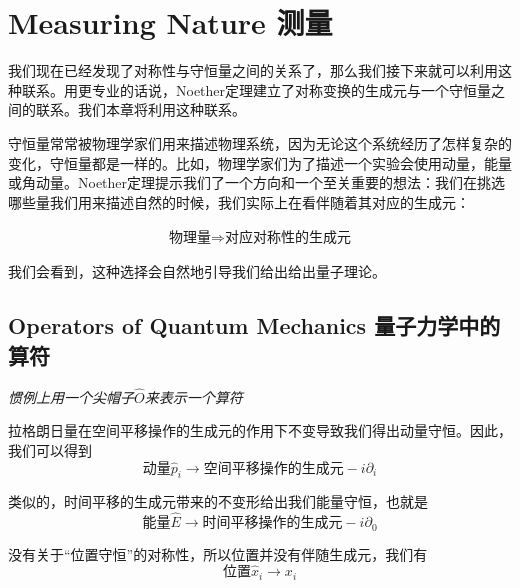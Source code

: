 


\chapter[测量]{Measuring Nature 测量}\label{chap5}

我们现在已经发现了对称性与守恒量之间的关系了，那么我们接下来就可以利用这种联系。用更专业的话说，Noether定理建立了对称变换的生成元与一个守恒量之间的联系。我们本章将利用这种联系。

守恒量常常被物理学家们用来描述物理系统，因为无论这个系统经历了怎样复杂的变化，守恒量都是一样的。比如，物理学家们为了描述一个实验会使用动量，能量或角动量。Noether定理提示我们了一个方向和一个至关重要的想法：我们在挑选哪些量我们用来描述自然的时候，我们实际上在看伴随着其对应的生成元：

\begin{align}
\text{物理量}\Rightarrow\text{对应对称性的生成元}
\end{align}

我们会看到，这种选择会自然地引导我们给出给出量子理论。

\section[量子力学中的算符]{Operators of Quantum Mechanics 量子力学中的算符}\label{sec5.1}

{\it 惯例上用一个尖帽子$\hat{O}$来表示一个算符}

拉格朗日量在空间平移操作的生成元的作用下不变导致我们得出动量守恒。因此，我们可以得到
\[\text{动量}\hat{p}_i\to\text{空间平移操作的生成元} - i\partial_i \]

类似的，时间平移的生成元带来的不变形给出我们能量守恒，也就是
\[\text{能量}\hat{E}\to\text{时间平移操作的生成元} - i\partial_0 \]

没有关于``位置守恒''的对称性，所以位置并没有伴随生成元，我们有
\[\text{位置}\hat{x}_i\to x_i \]

